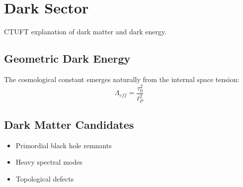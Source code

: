 \section{Dark Sector}
\label{sec:dark_sector}

CTUFT explanation of dark matter and dark energy.

\subsection{Geometric Dark Energy}

The cosmological constant emerges naturally from the internal space tension:
\begin{equation}
\Lambda_{eff} = \frac{\tau_0^2}{\ell_P^2}
\end{equation}

\subsection{Dark Matter Candidates}

\begin{itemize}
    \item Primordial black hole remnants
    \item Heavy spectral modes
    \item Topological defects
\end{itemize}
